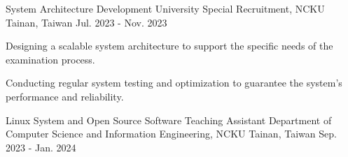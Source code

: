 
\begin{cventries}

  \cventry
  {System Architecture Development} %
  {University Special Recruitment, NCKU} %
  {Tainan, Taiwan} %
  {Jul. 2023 - Nov. 2023} %
  {
    \begin{cvitems} %
      \item {Designing a scalable system architecture to support the specific needs of the examination process.}
      \item {Conducting regular system testing and optimization to guarantee the system's performance and reliability.}
    \end{cvitems}
  }
  
  \cventry
  {Linux System and Open Source Software Teaching Assistant} %
  {Department of Computer Science and Information Engineering, NCKU} %
  {Tainan, Taiwan} %
  {Sep. 2023 - Jan. 2024} %
  {}

\end{cventries}

